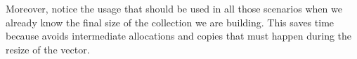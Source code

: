 Moreover, notice the usage 
that should be used in all those scenarios when we already know the final size of the
collection we are building. This saves time because avoids intermediate allocations and copies that must happen during the resize of the vector.







